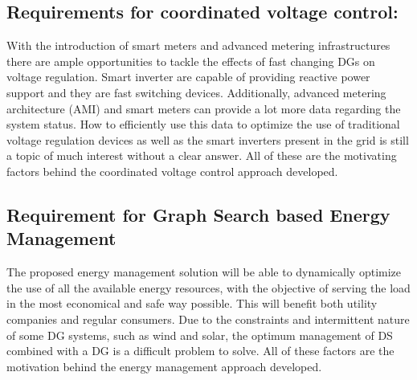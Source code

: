 \subsection{Requirements for coordinated voltage control:}
With the introduction of smart meters and advanced metering infrastructures there are ample opportunities to tackle the effects of fast changing DGs on voltage regulation. Smart inverter are capable of providing reactive power support and they are fast switching devices. Additionally, advanced metering architecture (AMI) and smart meters can provide a lot more data regarding the system status. How to efficiently use this data to optimize the use of traditional voltage regulation devices as well as the smart inverters present in the grid is still a topic of much interest without a clear answer. All of these are the motivating factors behind the coordinated voltage control approach developed.

\subsection{Requirement for Graph Search based Energy Management}
The proposed energy management solution will be able to dynamically optimize the use of all the available energy resources, with the objective of serving the load in the most economical and safe way possible. This will benefit both utility companies and regular consumers. Due to the constraints and intermittent nature of some DG systems, such as wind and solar, the optimum management of DS combined with a DG is a difficult problem to solve. All of these factors are the motivation behind the energy management approach developed.


